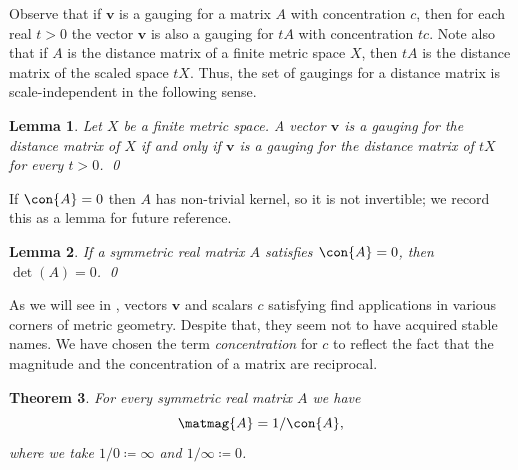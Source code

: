 \documentclass[a4paper, oneside, reqno]{amsart}
\newtheorem{theorem}{Theorem}[section]
\newtheorem{lemma}[theorem]{Lemma}
\theoremstyle{definition}
\theoremstyle{remark}
\numberwithin{equation}{section}
\renewcommand{\vec}{\mathbf}
\begin{document}
Observe that if \(\vec{v}\) is a gauging for a matrix \(A\) with concentration \(c\), then for each real \(t > 0\) the vector \(\vec{v}\) is also a gauging for \(tA\) with concentration \(tc\). Note also that if \(A\) is the distance matrix of a finite metric space \(X\), then \(tA\) is the distance matrix of the scaled space \(tX\). Thus, the set of gaugings for a distance matrix is scale-independent in the following sense.

\begin{lemma}
    Let \(X\) be a finite metric space. A vector \(\vec{v}\) is a gauging for the distance matrix of \(X\) if and only if \(\vec{v}\) is a gauging for the distance matrix of \(tX\) for every \(t > 0\). \qed
\end{lemma}

If \(\con{A} = 0\) then \(A\) has non-trivial kernel, so it is not invertible; we record this as a lemma for future reference.

\begin{lemma}
\label{lem:val0_det0}
    If a symmetric real matrix \(A\) satisfies \(\con{A} = 0\), then \(\det(A) = 0\). \qed
\end{lemma}

As we will see in , vectors \(\vec{v}\) and scalars \(c\) satisfying  find applications in various corners of metric geometry. Despite that, they seem not to have acquired stable names. We have chosen the term \emph{concentration} for \(c\) to reflect the fact that the magnitude and the concentration of a matrix are reciprocal.

\begin{theorem}
\label{thm:mag_val_reciprocal}
    For every symmetric real matrix \(A\) we have
    \[
        \matmag{A} = 1/\con{A},
    \]
    where we take \(1/0 \coloneq \infty\) and \(1/\infty \coloneq 0\).
\end{theorem}
\end{document}
